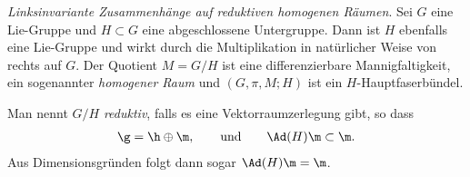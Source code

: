 \documentclass[%
	paper=a5,%
	fleqn,%
	DIV=18,%
	BCOR=0mm,
	fontsize=11pt,
	titlepage=false,%
	bibliography=totoc,
	DIV=18,%
	twoside=true,
	pdftitle=Riemannsche Geometrie,
	pdfauthor=Uwe Semmelmann,
	numbers=noendperiod]%
	{scrbook}
\begin{document}
\begin{ex}
\textit{Linksinvariante Zusammenhänge auf reduktiven homogenen Räumen}. Sei $G$
eine Lie-Gruppe und $H\subset G$ eine abgeschlossene Untergruppe. Dann ist $H$
ebenfalls eine Lie-Gruppe und wirkt durch die Multiplikation in
natürlicher Weise von rechts auf $G$. Der Quotient $M=G/H$ ist eine
differenzierbare Mannigfaltigkeit, ein sogenannter \emph{homogener Raum} und
$(G,\pi,M;H)$ ist ein $H$-Hauptfaserbündel.
\begin{figure}[H]
\centering
{}
\end{figure}
Man nennt $G/H$ \emph{reduktiv}, falls es eine Vektorraumzerlegung gibt, so dass
\begin{align*}
\g = \h\oplus\m,\qquad \text{und}\qquad \Ad(H)\m\subset \m.
\end{align*}
Aus Dimensionsgründen folgt dann sogar $\Ad(H)\m = \m$.


\end{ex}
\end{document}
